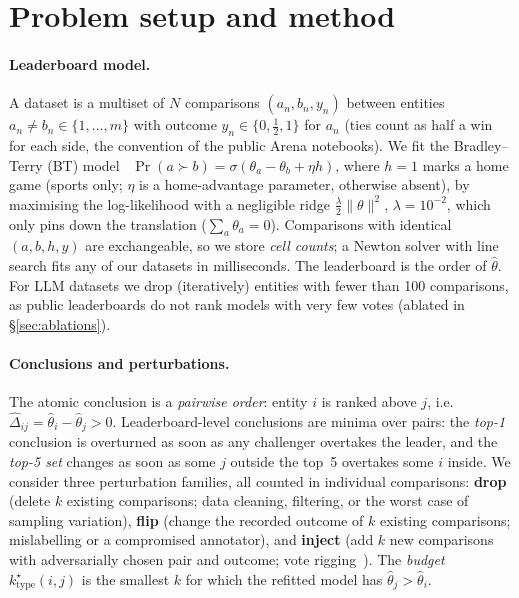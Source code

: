 \section{Problem setup and method}
\label{sec:method}

\paragraph{Leaderboard model.}
A dataset is a multiset of $N$ comparisons $(a_n,b_n,y_n)$ between entities $a_n\neq b_n\in\{1,\dots,m\}$ with outcome $y_n\in\{0,\tfrac12,1\}$ for $a_n$ (ties count as half a win for each side, the convention of the public Arena notebooks).
We fit the Bradley--Terry (BT) model~\citep{bradley1952rank} $\Pr(a\succ b)=\sigma(\theta_a-\theta_b+\eta h)$, where $h=1$ marks a home game (sports only; $\eta$ is a home-advantage parameter, otherwise absent), by maximising the log-likelihood with a negligible ridge $\tfrac{\lambda}{2}\|\theta\|^2$, $\lambda=10^{-2}$, which only pins down the translation ($\sum_a\theta_a=0$).
Comparisons with identical $(a,b,h,y)$ are exchangeable, so we store \emph{cell counts}; a Newton solver with line search fits any of our datasets in milliseconds.
The leaderboard is the order of $\hat\theta$.
For LLM datasets we drop (iteratively) entities with fewer than 100 comparisons, as public leaderboards do not rank models with very few votes (ablated in \S\ref{sec:ablations}).

\paragraph{Conclusions and perturbations.}
The atomic conclusion is a \emph{pairwise order}: entity $i$ is ranked above $j$, i.e.\ $\hat\Delta_{ij}=\hat\theta_i-\hat\theta_j>0$.
Leaderboard-level conclusions are minima over pairs: the \emph{top-1} conclusion is overturned as soon as any challenger overtakes the leader, and the \emph{top-5 set} changes as soon as some $j$ outside the top~5 overtakes some $i$ inside.
We consider three perturbation families, all counted in individual comparisons:
\textbf{drop} (delete $k$ existing comparisons; data cleaning, filtering, or the worst case of sampling variation),
\textbf{flip} (change the recorded outcome of $k$ existing comparisons; mislabelling or a compromised annotator),
and \textbf{inject} (add $k$ new comparisons with adversarially chosen pair and outcome; vote rigging~\citep{min2025improving}).
The \emph{budget} $k^\star_{\text{type}}(i,j)$ is the smallest $k$ for which the refitted model has $\hat\theta_j>\hat\theta_i$.

